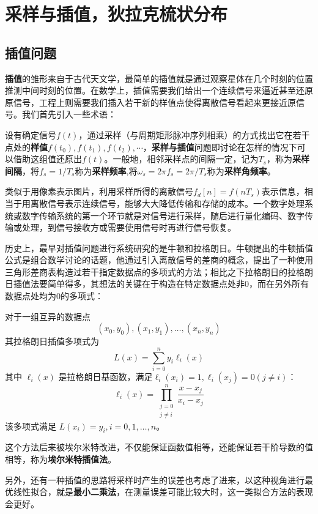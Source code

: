 \documentclass{ctexbook}
\begin{document}
\section{采样与插值，狄拉克梳状分布}\label{sec:Sampling_Interpolation}

\subsection{插值问题}\label{sub:interpolation}
\textbf{插值}的雏形来自于古代天文学，最简单的插值就是通过观察星体在几个时刻的位置推测中间时刻的位置。在数学上，插值需要我们给出一个连续信号来逼近甚至还原原信号，工程上则需要我们插入若干新的样值点使得离散信号看起来更接近原信号。我们首先引入一些术语：
\begin{definition}
设有确定信号$f(t)$，通过采样（与周期矩形脉冲序列相乘）的方式找出它在若干点处的\textbf{样值}$f(t_0),f(t_1),f(t_2),\cdots$，\textbf{采样与插值}问题即讨论在怎样的情况下可以借助这组值还原出$f(t)$。一般地，相邻采样点的间隔一定，记为$T_s$，称为\textbf{采样间隔}，将$f_s=1/T_s$称为\textbf{采样频率},将$\omega_s=2\pi f_s=2\pi/T_s$称为\textbf{采样角频率}。
\end{definition}

类似于用像素表示图片，利用采样所得的离散信号$f_d[n]=f(nT_s)$表示信息，相当于用离散信号表示连续信号，能够大大降低传输和存储的成本。一个数字处理系统或数字传输系统的第一个环节就是对信号进行采样，随后进行量化编码、数字传输或处理，到信号接收方或需要使用信号时再进行信号恢复。

历史上，最早对插值问题进行系统研究的是牛顿和拉格朗日。牛顿提出的牛顿插值公式是组合数学讨论的话题，他通过引入离散信号的差商的概念，提出了一种使用三角形差商表构造过若干指定数据点的多项式的方法；相比之下拉格朗日的拉格朗日插值法要简单得多，其想法的关键在于构造在特定数据点处非0，而在另外所有数据点处均为0的多项式：
\begin{definition}[拉格朗日插值法]
    对于一组互异的数据点
 \[(x_0,y_0),(x_1,y_1),\dots,(x_n,y_n)\]
 其拉格朗日插值多项式为
\[L(x) = \sum_{i=0}^{n} y_i \ell_i(x)\]
其中 $\ell_i(x)$ 是拉格朗日基函数，满足$\ell_i(x_i)=1,\ell_i(x_j)=0(j\neq i)$：
\[\ell_i(x) = \prod_{\substack{j=0 \\ j \neq i}}^{n} \frac{x - x_j}{x_i - x_j}\]
该多项式满足 $L(x_i) = y_i,i=0,1,\dots,n$。
\end{definition}
这个方法后来被埃尔米特改进，不仅能保证函数值相等，还能保证若干阶导数的值相等，称为\textbf{埃尔米特插值法}。

另外，还有一种插值的思路将采样时产生的误差也考虑了进来，以这种视角进行最优线性拟合，就是\textbf{最小二乘法}，在测量误差可能比较大时，这一类拟合方法的表现会更好。
\end{document}

